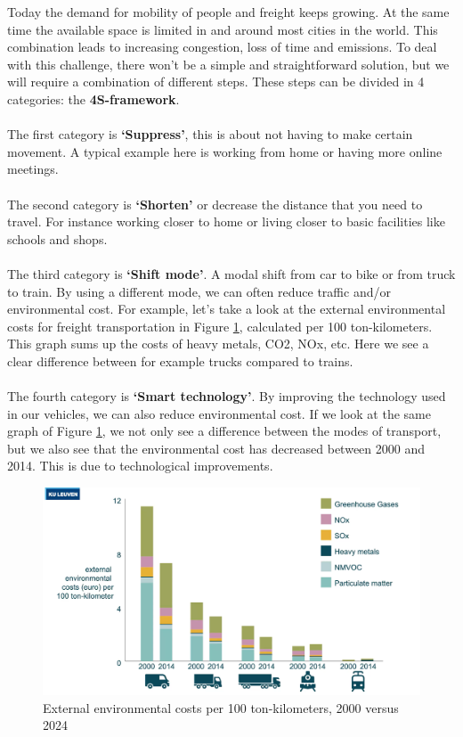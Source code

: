 \documentclass[../summary.tex]{subfiles}
\begin{document}
	Today the demand for mobility of people and freight keeps growing. At the same time the available space is limited in and around most cities in the world. This combination leads to increasing congestion, loss of time and emissions. To deal with this challenge, there won't be a simple and straightforward solution, but we will require a combination of different steps. These steps can be divided in 4 categories: the \textbf{4S-framework}.
	\\\\
	The first category is \textbf{‘Suppress’}, this is about not having to make certain movement. A typical example here is working from home or having more online meetings.
	\\\\
	The second category is \textbf{‘Shorten’} or decrease the distance that you need to travel. For instance working closer to home or living closer to basic facilities like schools and shops.
	\\\\
	The third category is \textbf{‘Shift mode’}. A modal shift from car to bike or from truck to train. By using a different mode, we can often reduce traffic and/or environmental cost. For example, let’s take a look at the external environmental costs for freight transportation in Figure \ref{fig:external-environmental-costs}, calculated per 100 ton-kilometers. This graph sums up the costs of heavy metals, CO2, NOx, etc. Here we see a clear difference between for example trucks compared to trains.
	\\\\	
	The fourth category is \textbf{‘Smart technology’}. By improving the technology used in our vehicles, we can also reduce environmental cost. If we look at the same graph of Figure \ref{fig:external-environmental-costs}, we not only see a difference between the modes of transport, but we also see that the environmental cost has decreased between 2000 and 2014. This is due to technological improvements. 
	
	\begin{figure}[H]
		\centering
		\includegraphics[width=1\linewidth]{images/9-external-environmental-cost.png}
		\caption{External environmental costs per 100 ton-kilometers, 2000 versus 2024}
		\label{fig:external-environmental-costs}
	\end{figure}
	
\end{document}
